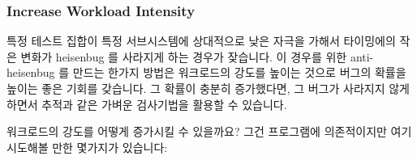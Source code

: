 \subsubsection{Increase Workload Intensity}
\label{sec:debugging:Increase Workload Intensity}

특정 테스트 집합이 특정 서브시스템에 상대적으로 낮은 자극을 가해서 타이밍에의
작은 변화가 heisenbug 를 사라지게 하는 경우가 잦습니다.
이 경우를 위한 anti-heisenbug 를 만드는 한가지 방법은 워크로드의 강도를 높이는
것으로 버그의 확률을 높이는 좋은 기회를 갖습니다.
그 확률이 충분히 증가했다면, 그 버그가 사라지지 않게 하면서 추적과 같은 가벼운
검사기법을 활용할 수 있습니다.

워크로드의 강도를 어떻게 증가시킬 수 있을까요?
그건 프로그램에 의존적이지만 여기 시도해볼 만한 몇가지가 있습니다:

